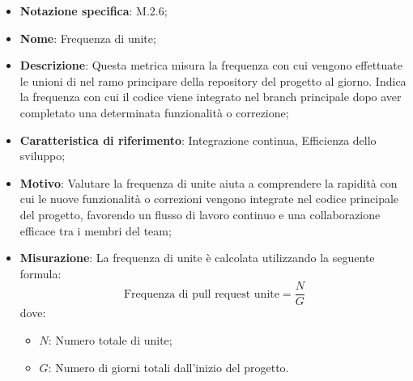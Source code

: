 \begin{itemize}
    \item \textbf{Notazione specifica}: M.2.6;
    \item \textbf{Nome}: Frequenza di  unite;
    \item \textbf{Descrizione}: Questa metrica misura la frequenza con cui vengono effettuate le unioni di  nel ramo principare della repository del progetto al giorno. Indica la frequenza con cui il codice viene integrato nel branch principale dopo aver completato una determinata funzionalità o correzione;
    \item \textbf{Caratteristica di riferimento}: Integrazione continua, Efficienza dello sviluppo;
    \item \textbf{Motivo}: Valutare la frequenza di  unite aiuta a comprendere la rapidità con cui le nuove funzionalità o correzioni vengono integrate nel codice principale del progetto, favorendo un flusso di lavoro continuo e una collaborazione efficace tra i membri del team;
    \item \textbf{Misurazione}: La frequenza di  unite è calcolata utilizzando la seguente formula:
    \[
        \text{Frequenza di pull request unite} =\frac{N}{G} 
    \]
    dove:
    \begin{itemize}
        \item $N$: Numero totale di  unite;
        \item $G$: Numero di giorni totali dall'inizio del progetto.
    \end{itemize}
   
\end{itemize}
